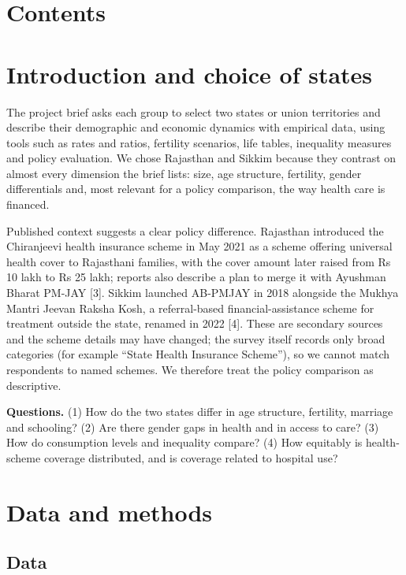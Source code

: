 \documentclass[10pt,a4paper]{article}
\begin{document}

\newpage
\section*{Contents}
\vspace{-6pt}
\tableofcontents
\vspace{6pt}
\newpage
\section{Introduction and choice of states}

The project brief asks each group to select two states or union territories and describe their demographic and economic dynamics with empirical data, using tools such as rates and ratios, fertility scenarios, life tables, inequality measures and policy evaluation. We chose Rajasthan and Sikkim because they contrast on almost every dimension the brief lists: size, age structure, fertility, gender differentials and, most relevant for a policy comparison, the way health care is financed.


Published context suggests a clear policy difference. Rajasthan introduced the Chiranjeevi health insurance scheme in May 2021 as a scheme offering universal health cover to Rajasthani families, with the cover amount later raised from Rs 10 lakh to Rs 25 lakh; reports also describe a plan to merge it with Ayushman Bharat PM-JAY [3]. Sikkim launched AB-PMJAY in 2018 alongside the Mukhya Mantri Jeevan Raksha Kosh, a referral-based financial-assistance scheme for treatment outside the state, renamed in 2022 [4]. These are secondary sources and the scheme details may have changed; the survey itself records only broad categories (for example ``State Health Insurance Scheme''), so we cannot match respondents to named schemes. We therefore treat the policy comparison as descriptive.


\textbf{Questions.} (1) How do the two states differ in age structure, fertility, marriage and schooling? (2) Are there gender gaps in health and in access to care? (3) How do consumption levels and inequality compare? (4) How equitably is health-scheme coverage distributed, and is coverage related to hospital use?


\section{Data and methods}

\subsection{Data}
\end{document}
